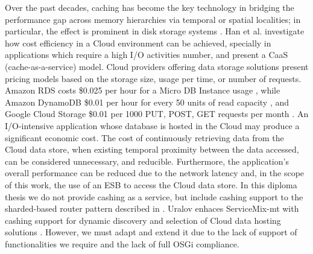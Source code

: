 Over the past decades, caching has become the key technology in bridging the performance gap across memory hierarchies via temporal or spatial localities; in particular, the effect is prominent in disk storage systems \cite{cashing2012}. Han et al. investigate how cost efficiency in a Cloud environment can be achieved, specially in applications which require a high I/O activities number, and present a CaaS (cache-as-a-service) model. Cloud providers offering data storage solutions present pricing models based on the storage size, usage per time, or number of requests. Amazon RDS costs \$0.025 per hour for a Micro DB Instance usage  \cite{amazonrds}, while Amazon DynamoDB \$0.01 per hour for every 50 units of read capacity \cite{amazondynamodb}, and Google Cloud Storage \$0.01 per 1000 PUT, POST, GET requests per month \cite{googlecloudstorage}. An I/O-intensive application whose database is hosted in the Cloud may produce a significant economic cost. The cost of continuously retrieving data from the Cloud data store, when existing temporal proximity between the data accessed, can be considered unnecessary, and reducible. Furthermore, the application's overall performance can be reduced due to the network latency and, in the scope of this work, the use of an \ac{ESB} to access the Cloud data store. In this diploma thesis we do not provide cashing as a service, but include cashing support to the sharded-based router pattern described in \cite{strauchABKL2012}. Uralov enhaces ServiceMix-mt with cashing support for dynamic discovery and selection of Cloud data hosting solutions \cite{Uralov2012}. However, we must adapt and extend it due to the lack of support of functionalities we require and the lack of full \ac{OSGi} compliance. 



\clearpage  